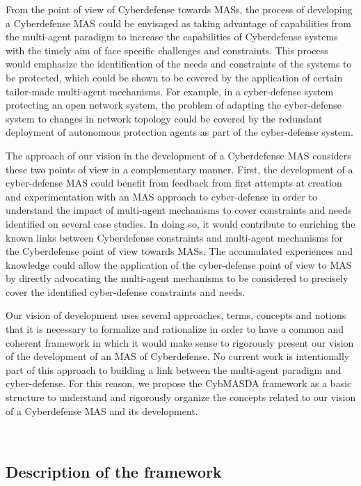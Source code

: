 \documentclass[conference]{IEEEtran}
\begin{document}
From the point of view of Cyberdefense towards MASs, the process of developing a Cyberdefense MAS could be envisaged as taking advantage of capabilities from the multi-agent paradigm to increase the capabilities of Cyberdefense systems with the timely aim of face specific challenges and constraints. This process would emphasize the identification of the needs and constraints of the systems to be protected, which could be shown to be covered by the application of certain tailor-made multi-agent mechanisms. For example, in a cyber-defense system protecting an open network system, the problem of adapting the cyber-defense system to changes in network topology could be covered by the redundant deployment of autonomous protection agents as part of the cyber-defense system.

The approach of our vision in the development of a Cyberdefense MAS considers these two points of view in a complementary manner. First, the development of a cyber-defense MAS could benefit from feedback from first attempts at creation and experimentation with an MAS approach to cyber-defense in order to understand the impact of multi-agent mechanisms to cover constraints and needs identified on several case studies. In doing so, it would contribute to enriching the known links between Cyberdefense constraints and multi-agent mechanisms for the Cyberdefense point of view towards MASs. The accumulated experiences and knowledge could allow the application of the cyber-defense point of view to MAS by directly advocating the multi-agent mechanisms to be considered to precisely cover the identified cyber-defense constraints and needs.

Our vision of development uses several approaches, terms, concepts and notions that it is necessary to formalize and rationalize in order to have a common and coherent framework in which it would make sense to rigorously present our vision of the development of an MAS of Cyberdefense. No current work is intentionally part of this approach to building a link between the multi-agent paradigm and cyber-defense. For this reason, we propose the CybMASDA framework as a basic structure to understand and rigorously organize the concepts related to our vision of a Cyberdefense MAS and its development.

\

\subsection{Description of the framework}
\end{document}
